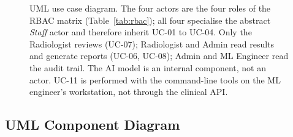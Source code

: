 \documentclass[12pt,a4paper]{article}
\begin{document}
\begin{figure}[H]
{}
\caption{UML use case diagram. The four actors are the four roles of the RBAC matrix
(Table~\ref{tab:rbac}); all four specialise the abstract \emph{Staff} actor and therefore inherit UC-01 to UC-04.
Only the Radiologist reviews (UC-07); Radiologist and Admin read results and generate reports (UC-06, UC-08); Admin and ML Engineer read the audit trail. The AI model is
an internal component, not an actor. UC-11 is performed with the command-line tools on the ML
engineer's workstation, not through the clinical API.}
\label{fig:usecase}
\end{figure}

\subsection{UML Component Diagram}
\end{document}
